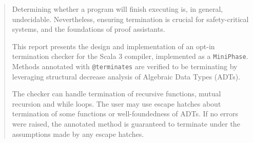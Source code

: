 \begin{abstract}

Determining whether a program will finish executing is,
in general, undecidable. Nevertheless, ensuring termination is crucial for
safety-critical systems, and the foundations of proof assistants.

This report presents the design and implementation of an opt-in termination
checker for the Scala 3 compiler, implemented as a \texttt{MiniPhase}.
Methods annotated with \texttt{@terminates} are verified to be terminating by 
leveraging structural decrease analysis of Algebraic Data Types (ADTs).

The checker can handle termination of recursive functions, mutual recursion
and while loops.
The user may use escape hatches about termination of some functions or
well-foundedness of ADTs.
If no errors were raised, the annotated method is guaranteed to terminate under
the assumptions made by any escape hatches.

\end{abstract}

